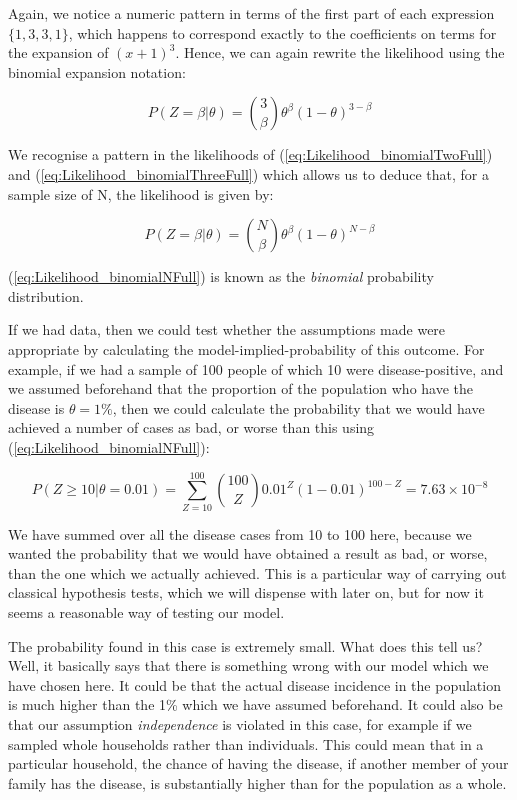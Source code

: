 \documentclass[11pt,fullpage]{book}
\begin{document}
Again, we notice a numeric pattern in terms of the first part of each expression $\{1,3,3,1\}$, which happens to correspond exactly to the coefficients on terms for the expansion of $(x+1)^3$. Hence, we can again rewrite the likelihood using the binomial expansion notation:

\begin{equation}\label{eq:Likelihood_binomialThreeFull}
P(Z=\beta|\theta) = {3 \choose \beta} \theta^\beta (1-\theta)^{3-\beta}
\end{equation}

We recognise a pattern in the likelihoods of (\ref{eq:Likelihood_binomialTwoFull}) and (\ref{eq:Likelihood_binomialThreeFull}) which allows us to deduce that, for a sample size of N, the likelihood is given by:

\begin{equation}\label{eq:Likelihood_binomialNFull}
P(Z=\beta|\theta) = {N \choose \beta} \theta^\beta (1-\theta)^{N-\beta}
\end{equation}

(\ref{eq:Likelihood_binomialNFull}) is known as the \textit{binomial} probability distribution.

If we had data, then we could test whether the assumptions made were appropriate by calculating the model-implied-probability of this outcome. For example, if we had a sample of 100 people of which 10 were disease-positive, and we assumed beforehand that the proportion of the population who have the disease is $\theta=1\%$, then we could calculate the probability that we would have achieved a number of cases as bad, or worse than this using (\ref{eq:Likelihood_binomialNFull}):

\begin{equation}
P(Z\geq 10|\theta=0.01) = \sum\limits_{Z=10}^{100}{100 \choose Z} 0.01^Z (1-0.01)^{100-Z} = 7.63 \times 10^{-8}
\end{equation}\label{eq:Likelihood_binomialTest}

We have summed over all the disease cases from 10 to 100 here, because we wanted the probability that we would have obtained a result as bad, or worse, than the one which we actually achieved. This is a particular way of carrying out classical hypothesis tests, which we will dispense with later on, but for now it seems a reasonable way of testing our model. 

The probability found in this case is extremely small. What does this tell us? Well, it basically says that there is something wrong with our model which we have chosen here. It could be that the actual disease incidence in the population is much higher than the 1\% which we have assumed beforehand. It could also be that our assumption \textit{independence} is violated in this case, for example if we sampled whole households rather than individuals. This could mean that in a particular household, the chance of having the disease, if another member of your family has the disease, is substantially higher than for the population as a whole. 
\end{document}
